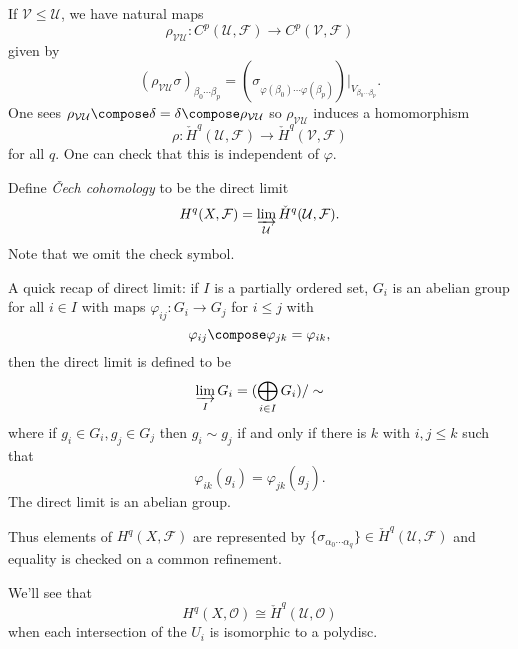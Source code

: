 \documentclass[a4paper]{article}
\begin{document}
If \(\mathcal V \leq \mathcal U\), we have natural maps
\[
  \rho_{\mathcal V \mathcal U}: C^p(\mathcal U, \mathcal F) \to C^p(\mathcal V, \mathcal F)
\]
given by
\[
  (\rho_{\mathcal V \mathcal U} \sigma)_{\beta_0 \cdots \beta_p} = (\sigma_{\varphi(\beta_0) \cdots \varphi(\beta_p)})|_{V_{\beta_0 \cdots \beta_p}}.
\]
One sees \(\rho_{\mathcal V \mathcal U} \compose \delta = \delta \compose \rho_{\mathcal V \mathcal U}\) so \(\rho_{\mathcal V \mathcal U}\) induces a homomorphism
\[
  \rho: \check H^q(\mathcal U, \mathcal F) \to \check H^q(\mathcal V, \mathcal F)
\]
for all \(q\). One can check that this is independent of \(\varphi\).

\begin{definition}
  Define \emph{Čech cohomology} to be the direct limit
  \[
    H^q(X, \mathcal F) = \varinjlim_{\mathcal U} \check H^q(\mathcal U, \mathcal F).
  \]
  Note that we omit the check symbol.
\end{definition}

A quick recap of direct limit: if \(I\) is a partially ordered set, \(G_i\) is an abelian group for all \(i \in I\) with maps \(\varphi_{ij}: G_i \to G_j\) for \(i \leq j\) with
\[
  \varphi_{ij} \compose \varphi_{jk} = \varphi_{ik},
\]
then the direct limit is defined to be
\[
  \varinjlim_I G_i = (\bigoplus_{i \in I} G_i) /\sim
\]
where if \(g_i \in G_i, g_j \in G_j\) then \(g_i \sim g_j\) if and only if there is \(k\) with \(i, j \leq k\) such that
\[
  \varphi_{ik} (g_i) = \varphi_{jk} (g_j).
\]
The direct limit is an abelian group.

Thus elements of \(H^q(X, \mathcal F)\) are represented by \(\{\sigma_{\alpha_0 \cdots \alpha_q}\} \in \check H^q(\mathcal U, \mathcal F)\) and equality is checked on a common refinement.

We'll see that
\[
  H^q(X, \mathcal O) \cong \check H^q(\mathcal U, \mathcal O)
\]
when each intersection of the \(U_i\) is isomorphic to a polydisc.
\end{document}
